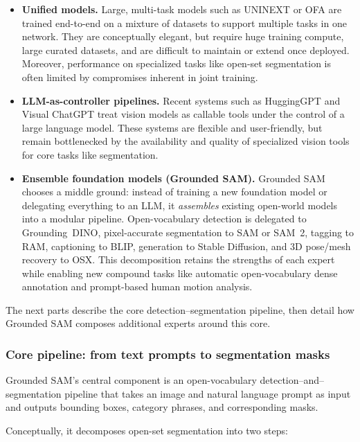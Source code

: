 \begin{enrichment}
\begin{enrichment}
		\begin{itemize}
			\item \textbf{Unified models.}
			Large, multi-task models such as UNINEXT or OFA are trained end-to-end on a mixture of datasets to support multiple tasks in one network.
			They are conceptually elegant, but require huge training compute, large curated datasets, and are difficult to maintain or extend once deployed.
			Moreover, performance on specialized tasks like open-set segmentation is often limited by compromises inherent in joint training.
			\item \textbf{LLM-as-controller pipelines.}
			Recent systems such as HuggingGPT and Visual ChatGPT treat vision models as callable tools under the control of a large language model.
			These systems are flexible and user-friendly, but remain bottlenecked by the availability and quality of specialized vision tools for core tasks like segmentation.
			\item \textbf{Ensemble foundation models (Grounded SAM).}
			Grounded SAM chooses a middle ground: instead of training a new foundation model or delegating everything to an LLM, it \emph{assembles} existing open-world models into a modular pipeline.
			Open-vocabulary detection is delegated to Grounding~DINO, pixel-accurate segmentation to SAM or SAM~2, tagging to RAM, captioning to BLIP, generation to Stable Diffusion, and 3D pose/mesh recovery to OSX.
			This decomposition retains the strengths of each expert while enabling new compound tasks like automatic open-vocabulary dense annotation and prompt-based human motion analysis.
		\end{itemize}
		
		The next parts describe the core detection–segmentation pipeline, then detail how Grounded SAM composes additional experts around this core.
		
		\subsubsection{Core pipeline: from text prompts to segmentation masks}
		\label{subsubsec:chapter15_groundedsam_method}
		
		Grounded SAM’s central component is an open-vocabulary detection–and–segmentation pipeline that takes an image and natural language prompt as input and outputs bounding boxes, category phrases, and corresponding masks.
		
		\newpage
		
		Conceptually, it decomposes open-set segmentation into two steps:
		

\end{enrichment}
\end{enrichment}
